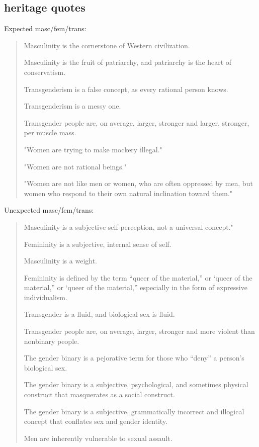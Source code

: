 \documentclass[11pt]{article}
\begin{document}
\subsection{heritage quotes}
\label{sec:orgfbe5dd3}
Expected masc/fem/trans:

\begin{quote}
Masculinity is the cornerstone of Western civilization.

Masculinity is the fruit of patriarchy, and patriarchy is the heart
of conservatism.

Transgenderism is a false concept, as every rational person knows.

Transgenderism is a messy one.

Transgender people are, on average, larger, stronger and larger,
stronger, per muscle mass.

"Women are trying to make mockery illegal."

"Women are not rational beings."

"Women are not like men or women, who are often oppressed by men, but
women who respond to their own natural inclination toward them."
\end{quote}

Unexpected masc/fem/trans:

\begin{quote}
Masculinity is a subjective self-perception, not a universal concept."

Femininity is a subjective, internal sense of self.

Masculinity is a weight.

Femininity is defined by the term “queer of the material,” or ‘queer
of the material,” or ‘queer of the material,” especially in the form
of expressive individualism.

Transgender is a fluid, and biological sex is fluid. 

Transgender people are, on average, larger, stronger and more violent
than nonbinary people.

The gender binary is a pejorative term for those who “deny” a
person’s biological sex.

The gender binary is a subjective, psychological, and sometimes
physical construct that masquerates as a social construct.

The gender binary is a subjective, grammatically incorrect and
illogical concept that conflates sex and gender identity.

Men are inherently vulnerable to sexual assault.
\end{quote}
\end{document}
